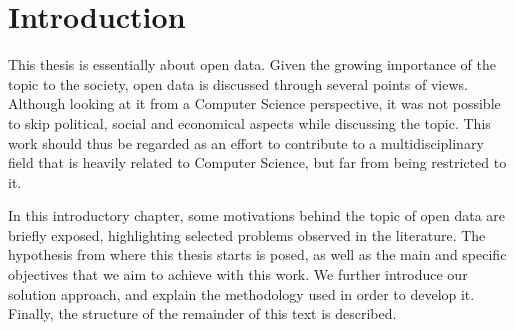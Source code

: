 \chapter{Introduction}

This thesis is essentially about open data.
Given the growing importance of the topic to the society, open data is discussed through several points of views.
Although looking at it from a Computer Science perspective, it was not possible to skip political, social and economical aspects while discussing the topic.
This work should thus be regarded as an effort to contribute to a multidisciplinary field that is heavily related to Computer Science, but far from being restricted to it.

In this introductory chapter, some motivations behind the topic of open data are briefly exposed, highlighting selected problems observed in the literature.
The hypothesis from where this thesis starts is posed, as well as the main and specific objectives that we aim to achieve with this work.
We further introduce our solution approach, and explain the methodology used in order to develop it. Finally, the structure of the remainder of this text is described.


